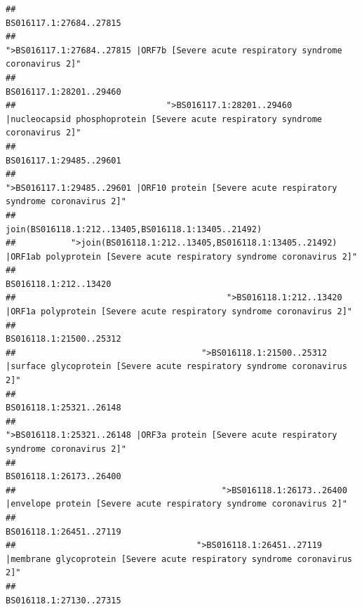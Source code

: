 \documentclass[
]{article}
\begin{document}
\begin{verbatim}
##                                                                                                                BS016117.1:27684..27815 
##                                                    ">BS016117.1:27684..27815 |ORF7b [Severe acute respiratory syndrome coronavirus 2]" 
##                                                                                                                BS016117.1:28201..29460 
##                              ">BS016117.1:28201..29460 |nucleocapsid phosphoprotein [Severe acute respiratory syndrome coronavirus 2]" 
##                                                                                                                BS016117.1:29485..29601 
##                                            ">BS016117.1:29485..29601 |ORF10 protein [Severe acute respiratory syndrome coronavirus 2]" 
##                                                                                    join(BS016118.1:212..13405,BS016118.1:13405..21492) 
##           ">join(BS016118.1:212..13405,BS016118.1:13405..21492) |ORF1ab polyprotein [Severe acute respiratory syndrome coronavirus 2]" 
##                                                                                                                  BS016118.1:212..13420 
##                                          ">BS016118.1:212..13420 |ORF1a polyprotein [Severe acute respiratory syndrome coronavirus 2]" 
##                                                                                                                BS016118.1:21500..25312 
##                                     ">BS016118.1:21500..25312 |surface glycoprotein [Severe acute respiratory syndrome coronavirus 2]" 
##                                                                                                                BS016118.1:25321..26148 
##                                            ">BS016118.1:25321..26148 |ORF3a protein [Severe acute respiratory syndrome coronavirus 2]" 
##                                                                                                                BS016118.1:26173..26400 
##                                         ">BS016118.1:26173..26400 |envelope protein [Severe acute respiratory syndrome coronavirus 2]" 
##                                                                                                                BS016118.1:26451..27119 
##                                    ">BS016118.1:26451..27119 |membrane glycoprotein [Severe acute respiratory syndrome coronavirus 2]" 
##                                                                                                                BS016118.1:27130..27315 

\end{verbatim}
\end{document}
